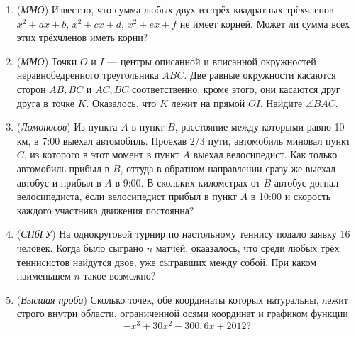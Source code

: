   \begin{enumerate}
    \item(\textit{ММО}) Известно, что сумма любых двух из трёх квадратных трёхчленов $x^2+ax+b$, $x^2+cx+d$, $x^2+ex+f$ не
    имеет корней. Может ли сумма всех этих трёхчленов иметь корни?
    \item(\textit{ММО})  Точки $O$ и $I$ --- центры описанной и вписанной окружностей неравнобедренного треугольника $ABC$. Две равные
    окружности касаются сторон $AB, BC$ и $AC, BC$ соответственно; кроме этого, они касаются друг друга в точке $K$. Оказалось, 
    что $K$ лежит на прямой $OI$. Найдите $\angle BAC$.
  \item(\textit{Ломоносов}) Из пункта $A$ в пункт $B$, расстояние между которыми равно 10 км, в 7:00 выехал автомобиль.
    Проехав $2/3$ пути, автомобиль миновал пункт $C$, из которого в этот момент в пункт
    $A$ выехал велосипедист. Как только автомобиль прибыл в $B$, оттуда в обратном направлении
    сразу же выехал автобус и прибыл в $A$ в 9:00. В скольких километрах от $B$ автобус догнал
    велосипедиста, если велосипедист прибыл в пункт $A$ в 10:00 и скорость каждого участника
    движения постоянна?
  \item(\textit{СПбГУ}) На однокруговой турнир по настольному теннису подало заявку 16 человек. Когда было
      сыграно $n$ матчей, окаазалось, что среди любых трёх теннисистов найдутся двое, уже сыгравших между
      собой. При каком наименьшем $n$ такое возможно?
    \item(\textit{Высшая проба}) Сколько точек, обе координаты которых натуральны, лежит строго внутри области,
      ограниченной осями координат и графиком функции \[-x^3+30x^2-300,6x+2012?\]
  \end{enumerate}

